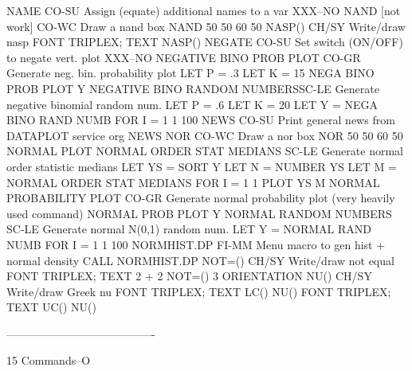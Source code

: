 NAME                        CO-SU Assign (equate) additional names to a var
                                  XXX--NO
NAND       [not work]       CO-WC Draw a nand box
                                  NAND 50 50 60 50
NASP()                      CH/SY Write/draw nasp
                                  FONT TRIPLEX; TEXT NASP()
NEGATE                      CO-SU Set switch (ON/OFF) to negate vert. plot
                                  XXX--NO
NEGATIVE BINO PROB PLOT     CO-GR Generate neg. bin. probability plot
                                  LET P = .3
                                  LET K = 15
                                  NEGA BINO PROB PLOT Y
NEGATIVE BINO RANDOM NUMBERSSC-LE Generate negative binomial random num.
                                  LET P = .6
                                  LET K = 20
                                  LET Y = NEGA BINO RAND NUMB FOR I = 1 1 100
NEWS                        CO-SU Print general news from DATAPLOT service org
                                  NEWS
NOR                         CO-WC Draw a nor box
                                  NOR 50 50 60 50
NORMAL PLOT
NORMAL ORDER STAT MEDIANS   SC-LE Generate normal order statistic medians
                                  LET YS = SORT Y
                                  LET N = NUMBER YS
                                  LET M = NORMAL ORDER STAT MEDIANS FOR I = 1 1
                                  PLOT YS M
NORMAL PROBABILITY PLOT     CO-GR Generate normal probability plot
                                  (very heavily used command)
                                  NORMAL PROB PLOT Y
NORMAL RANDOM NUMBERS       SC-LE Generate normal N(0,1) random num.
                                  LET Y = NORMAL RAND NUMB FOR I = 1 1 100
NORMHIST.DP                 FI-MM Menu macro to gen hist + normal density
                                  CALL NORMHIST.DP
NOT=()                      CH/SY Write/draw not equal
                                  FONT TRIPLEX; TEXT 2 + 2 NOT=() 3
ORIENTATION
NU()                        CH/SY Write/draw Greek nu
                                  FONT TRIPLEX; TEXT LC() NU()
                                  FONT TRIPLEX; TEXT UC() NU()
 
----------------------------------------
 
15
Commands--O
 
